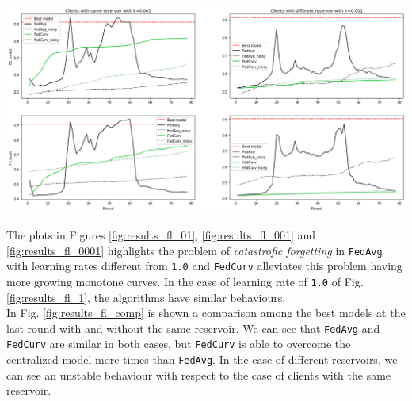 {{{\begin{center}
\begin{minipage}[c]{\textwidth}
    \centering
    \includegraphics[width=1.0\textwidth]{contents/Chapter6/results_fl_0001.png}
    \label{fig:results_fl_0001}
\end{minipage}
\end{center}

The plots in Figures \ref{fig:results_fl_01}, \ref{fig:results_fl_001} and \ref{fig:results_fl_0001} highlights the problem of \textit{catastrofic forgetting} in \texttt{FedAvg}  with learning rates different from \texttt{1.0} and \texttt{FedCurv} alleviates this problem having more growing monotone curves. In the case of learning rate of \texttt{1.0} of Fig. \ref{fig:results_fl_1}, the algorithms have similar behaviours. \\

In Fig. \ref{fig:results_fl_comp} is shown a comparison among the best models at the last round with and without the same reservoir. We can see that \texttt{FedAvg} and \texttt{FedCurv} are similar in both cases, but \texttt{FedCurv} is able to overcome the centralized model more times than \texttt{FedAvg}. In the case of different reservoirs, we can see an unstable behaviour with respect to the case of clients with the same reservoir.

}}}
